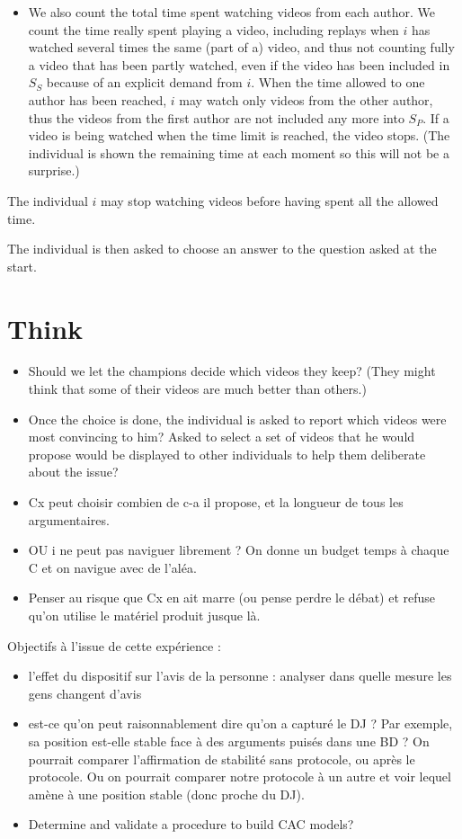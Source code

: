 \documentclass[version=3.21, pagesize, twoside=off, bibliography=totoc, DIV=calc, fontsize=12pt, a4paper]{scrartcl}
\begin{document}
\begin{itemize}
	\item We also count the total time spent watching videos from each author. We count the time really spent playing a video, including replays when $i$ has watched several times the same (part of a) video, and thus not counting fully a video that has been partly watched, even if the video has been included in $S_S$ because of an explicit demand from $i$. When the time allowed to one author has been reached, $i$ may watch only videos from the other author, thus the videos from the first author are not included any more into $S_P$. If a video is being watched when the time limit is reached, the video stops. (The individual is shown the remaining time at each moment so this will not be a surprise.)
\end{itemize}
The individual $i$ may stop watching videos before having spent all the allowed time.

The individual is then asked to choose an answer to the question asked at the start.

\section{Think}
\begin{itemize}
	\item Should we let the champions decide which videos they keep? (They might think that some of their videos are much better than others.)
	\item Once the choice is done, the individual is asked to report which videos were most convincing to him? Asked to select a set of videos that he would propose would be displayed to other individuals to help them deliberate about the issue?
	\item Cx peut choisir combien de c-a il propose, et la longueur de tous les argumentaires.
	\item OU i ne peut pas naviguer librement ? On donne un budget temps à chaque C et on navigue avec de l’aléa.
	\item Penser au risque que Cx en ait marre (ou pense perdre le débat) et refuse qu’on utilise le matériel produit jusque là.
\end{itemize}

Objectifs à l’issue de cette expérience : 
\begin{itemize}
	\item l’effet du dispositif sur l’avis de la personne : analyser dans quelle mesure les gens changent d’avis
	\item est-ce qu’on peut raisonnablement dire qu’on a capturé le DJ ? Par exemple, sa position est-elle stable face à des arguments puisés dans une BD ? On pourrait comparer l’affirmation de stabilité sans protocole, ou après le protocole. Ou on pourrait comparer notre protocole à un autre et voir lequel amène à une position stable (donc proche du DJ).
	\item Determine and validate a procedure to build CAC models?
\end{itemize}
\end{document}
